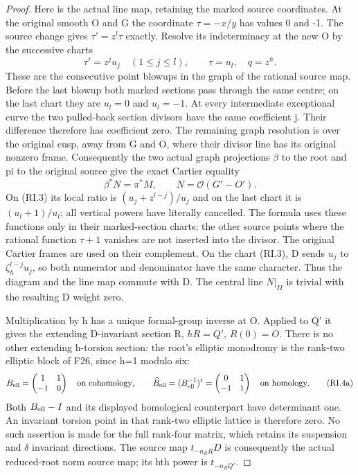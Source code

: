 \begin{proof}
Here is the actual line map, retaining the marked source coordinates.
At the original smooth O and G the coordinate \(\tau=-x/y\) has values
0 and -1. The source change gives \(\tau'=z^l\tau\) exactly. Resolve its
indeterminacy at the new O by the successive charts
\[
 \tau'=z^j u_j\quad(1\le j\le l),\qquad
                 \tau=u_l,\quad q=z^h.                \tag{RI.3}
\]
These are the consecutive point blowups in the graph of the rational
source map. Before the last blowup both marked sections pass through
the same centre; on the last chart they are \(u_l=0\) and \(u_l=-1\). At every
intermediate exceptional curve the two pulled-back section divisors
have the same coefficient j. Their difference therefore has coefficient
zero. The remaining graph resolution is over the original cusp, away
from G and O, where their divisor line has its original nonzero frame.
Consequently the two actual graph projections \(\beta\) to the root and pi
to the original source give the exact Cartier equality
\[
         \beta^*N=\pi^*M,\qquad N=\mathcal O(G'-O').     \tag{RI.4}
\]
On (RI.3) its local ratio is \((u_j+z^{l-j})/u_j\) and on the last chart
it is \((u_l+1)/u_l\); all vertical powers have literally cancelled.
The formula uses these functions only in their marked-section charts;
the other source points where the rational function \(\tau+1\) vanishes
are not inserted into the divisor. The original Cartier frames are
used on their complement. On the chart (RI.3), D sends \(u_j\) to
\(\zeta_h^{l-j}u_j\), so both numerator and denominator have the same
character. Thus the diagram and the line map commute with D. The
central line \(N|_{II}\) is trivial with the resulting D weight zero.

Multiplication by h has a unique formal-group inverse at O. Applied
to Q' it gives the extending D-invariant section R, \(hR=Q'\), \(R(0)=O\).
There is no other extending h-torsion section: the root's elliptic
monodromy is the rank-two elliptic block of F26, since h=1 modulo six:
\[
 B_{\rm ell}=\begin{pmatrix}1&1\\-1&0\end{pmatrix}
 \quad\text{on cohomology},\qquad
 \widehat B_{\rm ell}=(B_{\rm ell}^{-1})^t
       =\begin{pmatrix}0&1\\-1&1\end{pmatrix}
 \quad\text{on homology}.                               \tag{RI.4a}
\]
Both \(B_{\rm ell}-I\) and its displayed homological counterpart have determinant
one. An invariant torsion point in that rank-two elliptic lattice is
therefore zero. No such assertion is made for the full rank-four
matrix, which retains its suspension and \(\delta\) invariant directions.
The source map \(t_{-n_BR}D\) is consequently the actual reduced-root
norm source map; its hth power is \(t_{-n_BQ'}\).


\end{proof}
